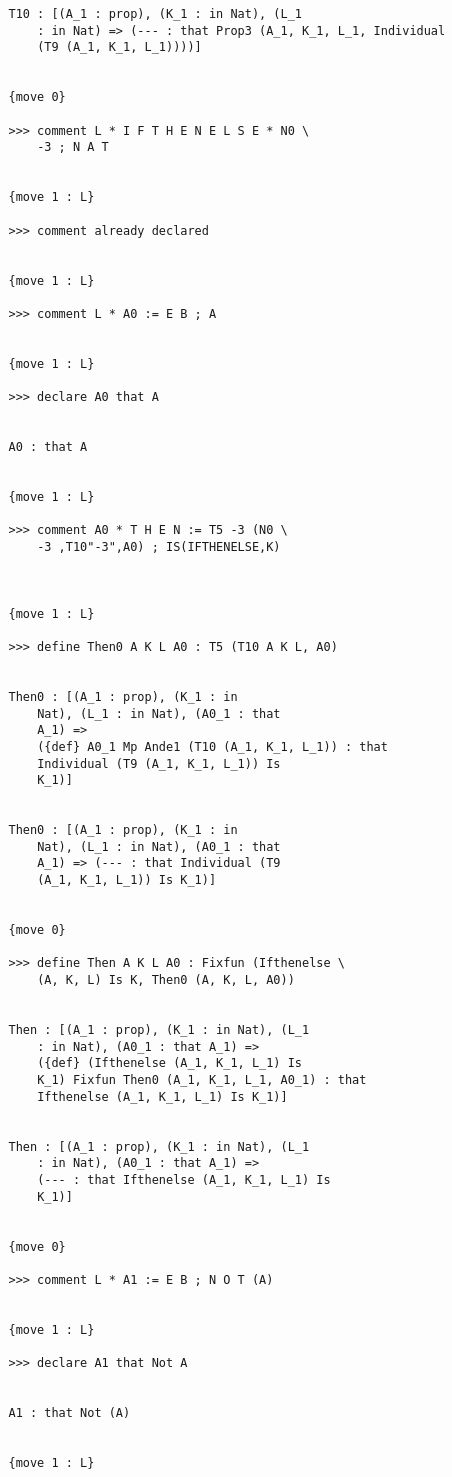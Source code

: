 \documentclass{article}
\begin{document}
\begin{verbatim}
   T10 : [(A_1 : prop), (K_1 : in Nat), (L_1 
       : in Nat) => (--- : that Prop3 (A_1, K_1, L_1, Individual 
       (T9 (A_1, K_1, L_1))))]


   {move 0}

   >>> comment L * I F T H E N E L S E * N0 \
       -3 ; N A T


   {move 1 : L}

   >>> comment already declared


   {move 1 : L}

   >>> comment L * A0 := E B ; A


   {move 1 : L}

   >>> declare A0 that A


   A0 : that A


   {move 1 : L}

   >>> comment A0 * T H E N := T5 -3 (N0 \
       -3 ,T10"-3",A0) ; IS(IFTHENELSE,K)



   {move 1 : L}

   >>> define Then0 A K L A0 : T5 (T10 A K L, A0)


   Then0 : [(A_1 : prop), (K_1 : in 
       Nat), (L_1 : in Nat), (A0_1 : that 
       A_1) => 
       ({def} A0_1 Mp Ande1 (T10 (A_1, K_1, L_1)) : that 
       Individual (T9 (A_1, K_1, L_1)) Is 
       K_1)]


   Then0 : [(A_1 : prop), (K_1 : in 
       Nat), (L_1 : in Nat), (A0_1 : that 
       A_1) => (--- : that Individual (T9 
       (A_1, K_1, L_1)) Is K_1)]


   {move 0}

   >>> define Then A K L A0 : Fixfun (Ifthenelse \
       (A, K, L) Is K, Then0 (A, K, L, A0))


   Then : [(A_1 : prop), (K_1 : in Nat), (L_1 
       : in Nat), (A0_1 : that A_1) => 
       ({def} (Ifthenelse (A_1, K_1, L_1) Is 
       K_1) Fixfun Then0 (A_1, K_1, L_1, A0_1) : that 
       Ifthenelse (A_1, K_1, L_1) Is K_1)]


   Then : [(A_1 : prop), (K_1 : in Nat), (L_1 
       : in Nat), (A0_1 : that A_1) => 
       (--- : that Ifthenelse (A_1, K_1, L_1) Is 
       K_1)]


   {move 0}

   >>> comment L * A1 := E B ; N O T (A)


   {move 1 : L}

   >>> declare A1 that Not A


   A1 : that Not (A)


   {move 1 : L}


\end{verbatim}
\end{document}
